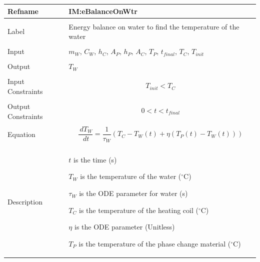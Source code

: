 \documentclass[12pt]{article}
\begin{document}
\noindent \begin{minipage}{\textwidth}
\begin{tabular}{>{\raggedright}p{}>{\raggedright\arraybackslash}p{}}
\toprule \textbf{Refname} & \textbf{IM:eBalanceOnWtr}
\label{IM:eBalanceOnWtr}
\\ \midrule \\
Label & Energy balance on water to find the temperature of the water
\\ \midrule \\
Input & ${m_{W}}$, ${C_{W}}$, ${h_{C}}$, ${A_{P}}$, ${h_{P}}$, ${A_{C}}$, ${T_{P}}$, ${t_{final}}$, ${T_{C}}$, ${T_{init}}$
\\ \midrule \\
Output & ${T_{W}}$
\\ \midrule \\
Input Constraints & \begin{displaymath}
                    {T_{init}}<{T_{C}}
                    \end{displaymath}
\\ \midrule \\
Output Constraints & \begin{displaymath}
                     0<t<{t_{final}}
                     \end{displaymath}
\\ \midrule \\
Equation & \begin{displaymath}
           \frac{\,d{T_{W}}}{\,dt}=\frac{1}{{τ_{W}}} \left({T_{C}}-{T_{W}}\left(t\right)+η \left({T_{P}}\left(t\right)-{T_{W}}\left(t\right)\right)\right)
           \end{displaymath}
\\ \midrule \\
Description & \begin{symbDescription}
              \item{$t$ is the time (s)}
              \item{${T_{W}}$ is the temperature of the water (${}^{\circ}$C)}
              \item{${τ_{W}}$ is the ODE parameter for water (s)}
              \item{${T_{C}}$ is the temperature of the heating coil (${}^{\circ}$C)}
              \item{$η$ is the ODE parameter (Unitless)}
              \item{${T_{P}}$ is the temperature of the phase change material (${}^{\circ}$C)}

\end{symbDescription}
\end{tabular}
\end{minipage}
\end{document}
